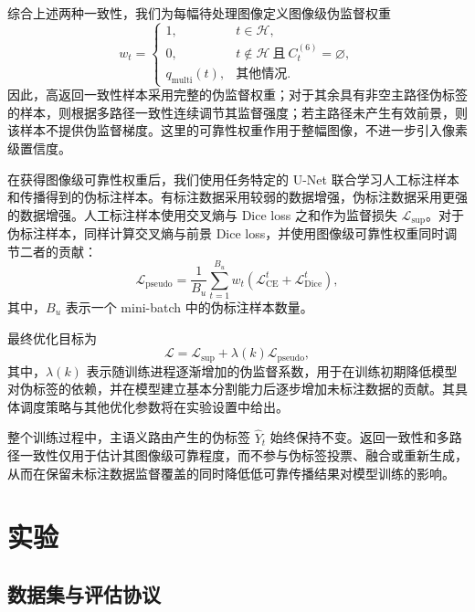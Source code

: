\documentclass[UTF8,a4paper,10pt,twocolumn]{ctexart}
\begin{document}
综合上述两种一致性，我们为每幅待处理图像定义图像级伪监督权重
\begin{equation}
w_t=
\begin{cases}
1,
& t\in\mathcal{H},\\[4pt]
0,
& t\notin\mathcal{H}
\ \text{且}\ 
C_t^{(6)}=\varnothing,\\[4pt]
q_{\mathrm{multi}}(t),
& \text{其他情况}.
\end{cases}
\end{equation}
因此，高返回一致性样本采用完整的伪监督权重；对于其余具有非空主路径伪标签的样本，则根据多路径一致性连续调节其监督强度；若主路径未产生有效前景，则该样本不提供伪监督梯度。这里的可靠性权重作用于整幅图像，不进一步引入像素级置信度。

在获得图像级可靠性权重后，我们使用任务特定的 U-Net 联合学习人工标注样本和传播得到的伪标注样本。有标注数据采用较弱的数据增强，伪标注数据采用更强的数据增强。人工标注样本使用交叉熵与 Dice loss 之和作为监督损失 $\mathcal{L}_{\mathrm{sup}}$。对于伪标注样本，同样计算交叉熵与前景 Dice loss，并使用图像级可靠性权重同时调节二者的贡献：
\begin{equation}
\mathcal{L}_{\mathrm{pseudo}}
=
\frac{1}{B_u}
\sum_{t=1}^{B_u}
w_t
\left(
\mathcal{L}_{\mathrm{CE}}^{t}
+
\mathcal{L}_{\mathrm{Dice}}^{t}
\right),
\end{equation}
其中，$B_u$ 表示一个 mini-batch 中的伪标注样本数量。

最终优化目标为
\begin{equation}
\mathcal{L}
=
\mathcal{L}_{\mathrm{sup}}
+
\lambda(k)\mathcal{L}_{\mathrm{pseudo}},
\end{equation}
其中，$\lambda(k)$ 表示随训练进程逐渐增加的伪监督系数，用于在训练初期降低模型对伪标签的依赖，并在模型建立基本分割能力后逐步增加未标注数据的贡献。其具体调度策略与其他优化参数将在实验设置中给出。

整个训练过程中，主语义路由产生的伪标签 $\widehat{Y}_t$ 始终保持不变。返回一致性和多路径一致性仅用于估计其图像级可靠程度，而不参与伪标签投票、融合或重新生成，从而在保留未标注数据监督覆盖的同时降低低可靠传播结果对模型训练的影响。









\section{实验}
\label{sec:experiments}

\subsection{数据集与评估协议}
\label{sec:datasets-protocol}
\end{document}

